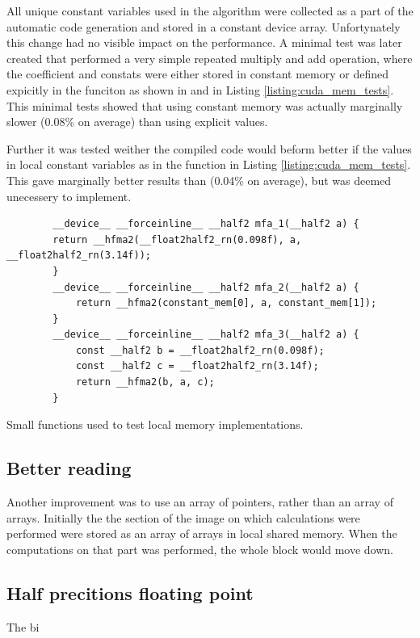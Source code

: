 All unique constant variables used in the algorithm were collected as a part of the automatic code generation and stored in a constant device array.
Unfortynately this change had no visible impact on the performance.
A minimal test was later created that performed a very simple repeated multiply and add operation, where the coefficient and constats were either stored in constant memory or defined expicitly in the funciton as shown in  and  in Listing \ref{listing:cuda_mem_tests}.
This minimal tests showed that using constant memory was actually marginally slower (0.08\% on average) than using explicit values.

Further it was tested weither the compiled code would beform better if the values in local constant variables as in the  function in Listing \ref{listing:cuda_mem_tests}.
This gave marginally better results than  (0.04\% on average), but was deemed unecessery to implement.

\begin{listing}[H]
    \begin{verbatim}
        __device__ __forceinline__ __half2 mfa_1(__half2 a) {
        return __hfma2(__float2half2_rn(0.098f), a, __float2half2_rn(3.14f));
        }
        __device__ __forceinline__ __half2 mfa_2(__half2 a) {
            return __hfma2(constant_mem[0], a, constant_mem[1]);
        }
        __device__ __forceinline__ __half2 mfa_3(__half2 a) {
            const __half2 b = __float2half2_rn(0.098f);
            const __half2 c = __float2half2_rn(3.14f);
            return __hfma2(b, a, c);
        }
    \end{verbatim}
    \caption{Small functions used to test local memory implementations.}
    \label{listing:cuda_mem_tests}
\end{listing}



\subsection{Better reading}
Another improvement was to use an array of pointers, rather than an array of arrays.
Initially the the section of the image on which calculations were performed were stored as an array of arrays in local shared memory.
When the computations on that part was performed, the whole block would move down.


\subsection{Half precitions floating point}
The bi